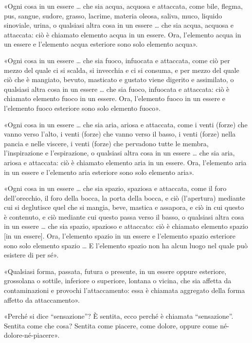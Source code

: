 «Ogni cosa in un essere … che sia acqua, acquosa e attaccata, come bile,
flegma, pus, sangue, sudore, grasso, lacrime, materia oleosa, saliva,
muco, liquido sinoviale, urina, o qualsiasi altra cosa in un essere …
che sia acqua, acquosa e attaccata: ciò è chiamato elemento acqua in un
essere. Ora, l’elemento acqua in un essere e l’elemento acqua esteriore
sono solo elemento acqua».


«Ogni cosa in un essere … che sia fuoco, infuocata e attaccata, come ciò
per mezzo del quale ci si scalda, si invecchia e ci si consuma, e per
mezzo del quale ciò che è mangiato, bevuto, masticato e gustato viene
digerito e assimilato, o qualsiasi altra cosa in un essere … che sia
fuoco, infuocata e attaccata: ciò è chiamato elemento fuoco in un
essere. Ora, l’elemento fuoco in un essere e l’elemento fuoco esteriore
sono solo elemento fuoco».


«Ogni cosa in un essere … che sia aria, ariosa e attaccata, come i venti
(forze) che vanno verso l’alto, i venti (forze) che vanno verso il
basso, i venti (forze) nella pancia e nelle viscere, i venti (forze) che
pervadono tutte le membra, l’inspirazione e l’espirazione, o qualsiasi
altra cosa in un essere … che sia aria, ariosa e attaccata: ciò è
chiamato elemento aria in un essere. Ora, l’elemento aria in un essere e
l’elemento aria esteriore sono solo elemento aria».


«Ogni cosa in un essere … che sia spazio, spaziosa e attaccata, come il
foro dell’orecchio, il foro della bocca, la porta della bocca, e ciò
(l’apertura) mediante cui si deglutisce quel che si mangia, beve,
mastica e assapora, e ciò in cui questo è contenuto, e ciò mediante cui
questo passa verso il basso, o qualsiasi altra cosa in un essere … che
sia spazio, spazioso e attaccato: ciò è chiamato elemento spazio [in un
essere]. Ora, l’elemento spazio in un essere e l’elemento spazio
esteriore sono solo elemento spazio … E l’elemento spazio non ha alcun
luogo nel quale può esistere di per sé».




«Qualsiasi forma, passata, futura o presente, in un essere oppure
esteriore, grossolana o sottile, inferiore o superiore, lontana o
vicina, che sia affetta da contaminazioni e provochi l’attaccamento:
essa è chiamata aggregato della forma affetto da attaccamento».




«Perché si dice “sensazione”? È sentita, ecco perché è chiamata
“sensazione”. Sentita come che cosa? Sentita come piacere, come dolore,
oppure come né-dolore-né-piacere».


